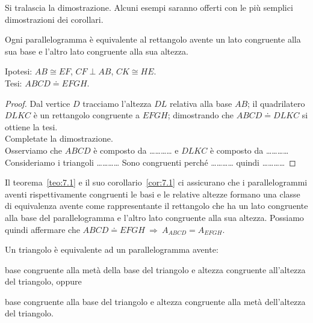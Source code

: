 Si tralascia la dimostrazione. Alcuni esempi saranno offerti con le più 
semplici dimostrazioni dei corollari.
 
\begin{corollario}\label{cor:7.1}
Ogni parallelogramma è equivalente al rettangolo avente un lato 
congruente alla sua base e l'altro lato congruente alla sua altezza.
\end{corollario}

\noindent Ipotesi: $AB\cong EF$, $CF\perp AB$, $CK\cong HE$.\\
Tesi: $ABCD\doteq EFGH$.

\begin{figure*}[!htb]
  \centering
\end{figure*}

\noindent\begin{minipage}{0.65\textwidth}\parindent15pt
\begin{proof}
Dal vertice $D$ tracciamo l'altezza $DL$ relativa alla base $AB$; il 
quadrilatero $DLKC$ è un rettangolo congruente a $EFGH$; dimostrando 
che $ABCD\doteq DLKC$ si ottiene la tesi.\\
Completate la dimostrazione.\\
Osserviamo che $ABCD$ è composto da \ldots\ldots\ldots\ldots{}
e $DLKC$ è composto da \ldots\ldots\ldots\ldots{} 
Consideriamo i triangoli \ldots\ldots\ldots\ldots{}
Sono congruenti perché \ldots\ldots\ldots\ldots{}
quindi \ldots\ldots\ldots\ldots{}
\end{proof}
\end{minipage}\hfil
\begin{minipage}{0.35\textwidth}
  \centering
\end{minipage}\vspace{5pt}

Il teorema~\ref{teo:7.1} e il suo corollario~\ref{cor:7.1} ci 
assicurano che i parallelogrammi aventi rispettivamente congruenti le 
basi e le relative altezze formano una classe di equivalenza avente 
come rappresentante il rettangolo che ha un lato congruente alla base 
del parallelogramma e l'altro lato congruente alla sua altezza. 
Possiamo quindi affermare che $ABCD\doteq EFGH \:\Rightarrow\: 
A_{ABCD} = A_{EFGH}$.

\begin{teorema}\label{teo:7.2}
Un triangolo è equivalente ad un parallelogramma avente:
\begin{enumeratea}
\item base congruente alla metà della base del triangolo e altezza 
congruente all'altezza del triangolo, oppure
\item base congruente alla base del triangolo e altezza congruente 
alla metà dell'altezza del triangolo.
\end{enumeratea}
\end{teorema}

